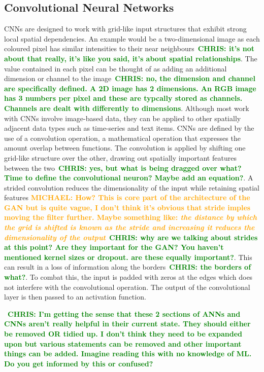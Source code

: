 \documentclass[12pt]{iopart}
\newcommand{\chris}[1]{\textbf{\textcolor{green}{CHRIS: #1}}}
\newcommand{\michael}[1]{\textbf{\textcolor{orange}{MICHAEL: #1}}}
\begin{document}
\subsection{Convolutional Neural Networks}
%
\acp{CNN} are designed to work with grid-like input structures that exhibit
strong local spatial dependencies. An example would be a two-dimensional image
as each coloured pixel has similar intensities to their near
neighbours~\chris{it's not about that really, it's like you said, it's about
spatial relationships}. The value contained in each pixel can be thought of as
adding an additional dimension or channel to the image~\chris{no, the dimension
and channel are specifically defined. A 2D image has 2 dimensions. An RGB image
has 3 numbers per pixel and these are typcally stored as channels. Channels are
dealt with differently to dimensions}. Although most work with \acp{CNN}
involve image-based data, they can be applied to other spatially adjacent data
types such as time-series and text items. \acp{CNN} are defined by the use of a
convolution operation, a mathematical operation that expresses the amount
overlap between functions. The convolution is applied by shifting one grid-like
structure over the other, drawing out spatially important features between the
two~\chris{yes, but what is being dragged over what? Time to define the
convolutional neuron? Maybe add an equation?}. A strided convolution reduces
the dimensionality of the input while retaining spatial features \michael{How?
This is core part of the architecture of the GAN but is quite vague, I don't
think it's obvious that stride imples moving the filter further. Maybe
something like: \textit{the distance by which the grid is shifted is known as
the stride and increasing it reduces the dimensionality of the
output}}~\chris{why are we talking about strides at this point? Are they
important for the GAN? You haven't mentioned kernel sizes or dropout. are these
equally important?}. This can result in a loss of information along the
borders~\chris{the borders of what?}. To combat this, the input is padded with
zeros at the edges which does not interfere with the convolutional operation.
The output of the convolutional layer is then passed to an activation function.

~\chris{I'm getting the sense that these 2 sections of ANNs and CNNs aren't
really helpful in their current state. They should either be removed OR tidied
up. I don't think they need to be expanded upon but various statements can be
removed and other important things can be added. Imagine reading this with no
knowledge of ML. Do you get informed by this or confused?} 
\end{document}
